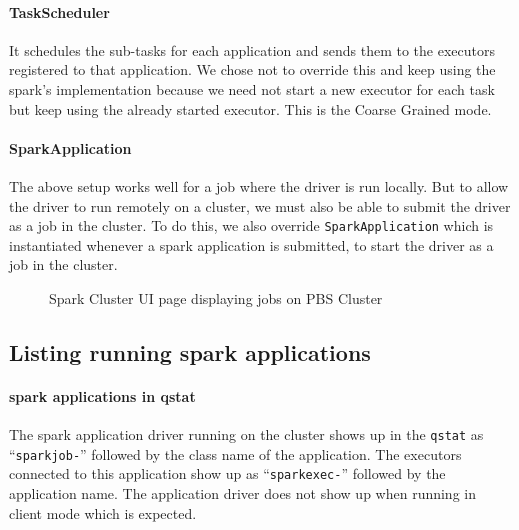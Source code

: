 \paragraph{TaskScheduler} It schedules the sub-tasks for each application and
sends them to the \glspl{executor} registered to that application. We chose not
to override this and keep using the \gls{spark}'s implementation because we need
not start a new \gls{executor} for each task but keep using the already started
\gls{executor}. This is the Coarse Grained mode.

\paragraph{SparkApplication}
The above setup works well for a job where the \gls{driver} is run locally. But
to allow the \gls{driver} to run remotely on a cluster, we must also be able to
submit the \gls{driver} as a job in the cluster. To do this, we also override
\texttt{SparkApplication} which is instantiated whenever a \gls{spark}
application is submitted, to start the \gls{driver} as a  job in
the cluster.

\begin{figure}[h]
    \centering
    \caption{Spark Cluster UI page displaying jobs on PBS Cluster}
\end{figure}


\subsection{Listing running \gls{spark} applications}

\paragraph{\gls{spark} applications in qstat} The \gls{spark}
application driver running on the  cluster shows up in the
\texttt{qstat} as ``\texttt{sparkjob-}'' followed by the class name of the
application. The executors connected to this application show up as
``\texttt{sparkexec-}'' followed by the application name. The application
driver does not show up when running in client mode which is expected.

